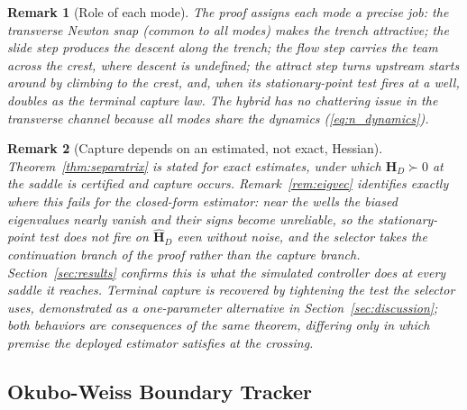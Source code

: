 \documentclass[lettersize,journal]{IEEEtran}
\newtheorem{remark}{Remark}
\begin{document}
\begin{remark}[Role of each mode]
The proof assigns each mode a precise job: the transverse Newton snap
(common to all modes) makes the trench attractive; the slide step produces the
descent along the trench; the flow step carries the team across the crest, where
descent is undefined; the attract step turns upstream starts around by climbing to
the crest, and, when its stationary-point test fires at a well, doubles as the
terminal capture law. The
hybrid has no chattering issue in the transverse channel because all
modes share the dynamics (\ref{eq:n_dynamics}).
\end{remark}

\begin{remark}[Capture depends on an estimated, not exact, Hessian]
\label{rem:capture_gap}
Theorem~\ref{thm:separatrix} is stated for exact estimates, under which
$\mathbf{H}_D \succ 0$ at the saddle is certified and capture occurs.
Remark~\ref{rem:eigvec} identifies exactly where this fails for the
closed-form estimator: near the wells the biased eigenvalues nearly
vanish and their signs become unreliable, so the stationary-point test
does not fire on $\hat{\mathbf{H}}_D$ even without noise, and the
selector takes the continuation branch of the proof rather than the
capture branch. Section~\ref{sec:results} confirms this is what the
simulated controller does at every saddle it reaches. Terminal capture
is recovered by tightening the test the selector uses, demonstrated as
a one-parameter alternative in Section~\ref{sec:discussion}; both
behaviors are consequences of the same theorem, differing only in which
premise the deployed estimator satisfies at the crossing.
\end{remark}

\subsection{Okubo-Weiss Boundary Tracker}
\label{sec:stab_ow}
\end{document}
